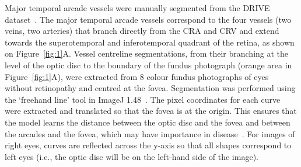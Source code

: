 \documentclass[11pt,]{article}
\begin{document}
Major temporal arcade vessels were manually segmented from the DRIVE dataset~\cite{Staal_2004}.
The major temporal arcade vessels correspond to the four
vessels (two veins, two arteries) that branch directly from the
CRA and CRV and extend towards the superotemporal and inferotemporal quadrant of 
the retina, as shown on Figure~\ref{fig:1}A.
Vessel centreline segmentations, from their branching at
the level of the optic disc to the boundary of the fundus photograph (orange area in Figure~\ref{fig:1}A),
were extracted from 8 colour fundus photographs of eyes without retinopathy and centred at the fovea.
Segmentation was performed using the
`freehand line' tool in ImageJ 1.48~\cite{Schneider2012}.  The pixel
coordinates for each curve were extracted and translated so that the
fovea is at the origin.  This ensures that the model learns the
distance between the optic disc and the fovea and between the arcades
and the fovea, which may have importance in disease~\cite{Arslan2021}.
For images of right eyes, curves are reflected across the y-axis so that all shapes correspond to left eyes (i.e., the optic disc will be on the left-hand side of the image).
\end{document}
